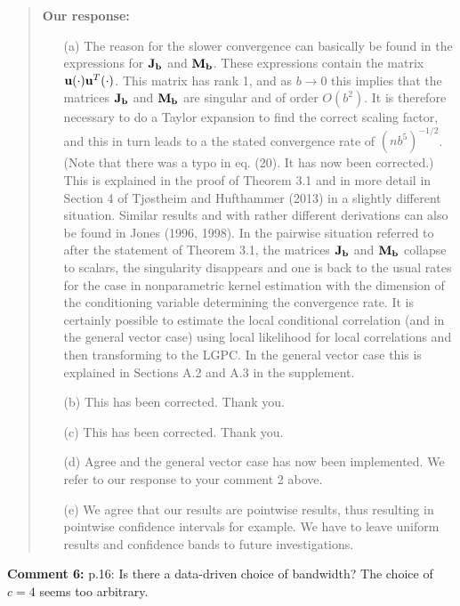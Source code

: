 \documentclass[
  12pt,
  letterpaper]{article}
\numberwithin{equation}{section}
\begin{document}
\begin{quote}
\textbf{Our response:}

\begin{itemize}
\item[(a)] The reason for the slower convergence can basically be found in the expressions for ${\bf J}_{\bf b}$ and ${\bf M}_{\bf b}$. These expressions contain the matrix ${\bf u}(\cdot) {\bf u}^T(\cdot)$. This matrix has rank 1, and as $b \to 0$ this implies that the matrices ${\bf J}_{\bf b}$ and ${\bf M}_{\bf b}$ are singular and of order $O(b^2)$. It is therefore necessary to do a Taylor expansion to find the correct scaling factor, and this in turn leads to a the stated convergence rate of $(nb^5)^{-1/2}$. (Note that there was a typo in eq. (20). It has now been corrected.) This is explained in the proof of Theorem 3.1 and in more detail in Section 4 of Tjøstheim and Hufthammer (2013)  in  a slightly different situation. Similar results and with  rather different derivations can also be found in Jones (1996, 1998). In the pairwise situation referred to after the statement of Theorem 3.1, the matrices ${\bf J}_{\bf b}$ and ${\bf M}_{\bf b}$ collapse to scalars, the singularity disappears and one is back to the usual rates for the case in nonparametric kernel estimation with the dimension of the conditioning variable determining the convergence rate.
\vspace{.3cm} \newline It is certainly possible to estimate the local conditional correlation (and in the general vector case) using local likelihood for local correlations and then transforming to the LGPC. In the general vector case this is explained in Sections A.2 and A.3 in the supplement.
\item[(b)] This has been corrected. Thank you.
\item[(c)] This has been corrected. Thank you.
\item[(d)] Agree and the general vector case has now been implemented. We refer to our response to your comment 2 above.
\item[(e)] We agree that our results are pointwise results, thus resulting in pointwise confidence intervals for example. We have to leave uniform results and confidence bands to future investigations.
\end{itemize}
\end{quote}

\textbf{Comment 6:} p.16: Is there a data-driven choice of bandwidth? The choice of \(c=4\) seems too arbitrary.
\end{document}
